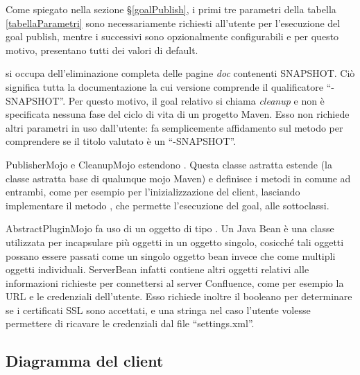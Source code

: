 Come spiegato nella sezione \S\ref{goalPublish}, i primi tre parametri della tabella \ref{tabellaParametri} sono necessariamente richiesti all'utente per l'esecuzione del goal publish, mentre i successivi sono opzionalmente configurabili e per questo motivo, presentano tutti dei valori di default.

 si occupa dell'eliminazione completa delle pagine \emph{doc} contenenti SNAPSHOT.
Ciò significa tutta la documentazione la cui versione comprende il qualificatore ``-SNAPSHOT''.
Per questo motivo, il goal relativo si chiama \emph{cleanup} e non è specificata nessuna fase del ciclo di vita di un progetto Maven.
Esso non richiede altri parametri in uso dall'utente: fa semplicemente affidamento sul metodo  per comprendere se il titolo valutato è un ``-SNAPSHOT''.

PublisherMojo e CleanupMojo estendono .
Questa classe astratta estende  (la classe astratta base di qualunque mojo Maven) e definisce i metodi in comune ad entrambi, come per esempio  per l'inizializzazione del client, lasciando implementare il metodo , che permette l'esecuzione del goal, alle sottoclassi.

AbstractPluginMojo fa uso di un oggetto di tipo .
Un Java Bean è una classe utilizzata per incapsulare più oggetti in un oggetto singolo, cosicché tali oggetti possano essere passati come un singolo oggetto bean invece che come multipli oggetti individuali.
ServerBean infatti contiene altri oggetti relativi alle informazioni richieste per connettersi al server Confluence, come per esempio la URL e le credenziali dell'utente.
Esso richiede inoltre il booleano  per determinare se i certificati SSL sono accettati, e una stringa  nel caso l'utente volesse permettere di ricavare le credenziali dal file ``settings.xml''.

\subsection{Diagramma del client}

